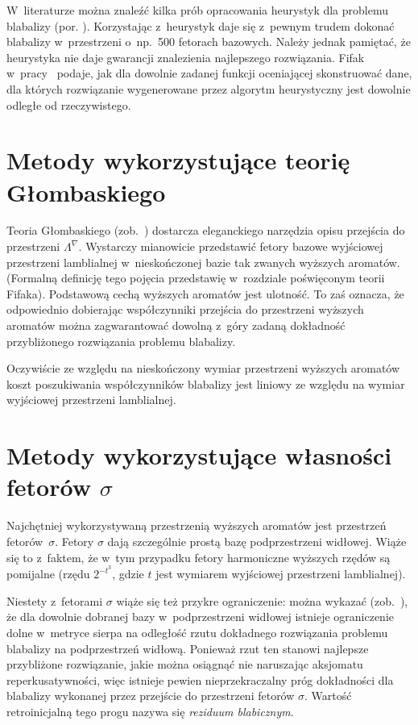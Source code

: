 \documentclass[licencjacka,en]{pracamgr}
\begin{document}
W~literaturze można znaleźć kilka prób opracowania heurystyk dla
problemu blabalizy (por. \cite{heu}).  Korzystając z~heurystyk daje
się z~pewnym trudem dokonać blabalizy w~przestrzeni o~np.~500 fetorach
bazowych.  Należy jednak pamiętać, że heurystyka nie daje gwarancji
znalezienia najlepszego rozwiązania.  Fifak w~pracy~\cite{ff-sr}
podaje, jak dla dowolnie zadanej funkcji oceniającej skonstruować
dane, dla których rozwiązanie wygenerowane przez algorytm heurystyczny
jest dowolnie odległe od rzeczywistego.

\section{Metody wykorzystujące teorię Głombaskiego}

Teoria Głombaskiego (zob.~\cite{grglo}) dostarcza eleganckiego
narzędzia opisu przejścia do przestrzeni $\Lambda^{\nabla}$.
Wystarczy mianowicie przedstawić fetory bazowe wyjściowej przestrzeni
lamblialnej w~nieskończonej bazie tak zwanych wyższych aromatów.
(Formalną definicję tego pojęcia przedstawię w~rozdziale poświęconym
teorii Fifaka).  Podstawową cechą wyższych aromatów jest ulotność.  To
zaś oznacza, że odpowiednio dobierając współczynniki przejścia do
przestrzeni wyższych aromatów można zagwarantować dowolną z~góry
zadaną dokładność przybliżonego rozwiązania problemu blabalizy.

Oczywiście ze względu na nieskończony wymiar przestrzeni wyższych
aromatów koszt poszukiwania współczynników blabalizy jest liniowy ze
względu na wymiar wyjściowej przestrzeni lamblialnej.

\section{Metody wykorzystujące własności fetorów $\sigma$}

Najchętniej wykorzystywaną przestrzenią wyższych aromatów jest
przestrzeń fetorów~$\sigma$.  Fetory $\sigma$ dają szczególnie prostą
bazę podprzestrzeni widłowej.  Wiąże się to z~faktem, że w~tym przypadku
fetory harmoniczne wyższych rzędów są pomijalne (rzędu $2^{-t^3}$,
gdzie $t$ jest wymiarem wyjściowej przestrzeni lamblialnej).

Niestety z~fetorami $\sigma$ wiąże się też przykre ograniczenie: można
wykazać (zob.~\cite[s. 374]{ff-sr}), że dla dowolnie dobranej bazy
w~podprzestrzeni widłowej istnieje ograniczenie dolne w~metryce sierpa
na odległość rzutu dokładnego rozwiązania problemu blabalizy na
podprzestrzeń widłową.  Ponieważ rzut ten stanowi najlepsze
przybliżone rozwiązanie, jakie można osiągnąć nie naruszając aksjomatu
reperkusatywności, więc istnieje pewien nieprzekraczalny próg
dokładności dla blabalizy wykonanej przez przejście do przestrzeni
fetorów $\sigma$.  Wartość retroinicjalną tego progu nazywa się
\textit{reziduum blabicznym}.
\end{document}
